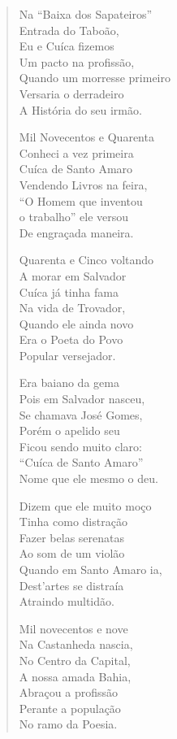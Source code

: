 \begin{verse}
Na ``Baixa dos Sapateiros'' \\
Entrada do Taboão, \\
Eu e Cuíca fizemos \\
Um pacto na profissão, \\
Quando um morresse primeiro \\
Versaria o derradeiro \\
A História do seu irmão. 

Mil Novecentos e Quarenta \\
Conheci a vez primeira \\
Cuíca de Santo Amaro \\
Vendendo Livros na feira, \\
``O Homem que inventou \\
o trabalho'' ele versou \\
De engraçada maneira. 

Quarenta e Cinco voltando \\
A morar em Salvador \\
Cuíca já tinha fama \\
Na vida de Trovador, \\
Quando ele ainda novo \\
Era o Poeta do Povo \\
Popular versejador. 
\pagebreak

Era baiano da gema \\
Pois em Salvador nasceu, \\
Se chamava José Gomes, \\
Porém o apelido seu \\
Ficou sendo muito claro: \\
``Cuíca de Santo Amaro'' \\
Nome que ele mesmo o deu. 

Dizem que ele muito moço \\
Tinha como distração \\
Fazer belas serenatas \\
Ao som de um violão \\
Quando em Santo Amaro ia, \\
Dest'artes se distraía \\
Atraindo multidão. 

Mil novecentos e nove \\
Na Castanheda nascia, \\
No Centro da Capital, \\
A nossa amada Bahia, \\
Abraçou a profissão \\
Perante a população \\
No ramo da Poesia. 


\end{verse}
